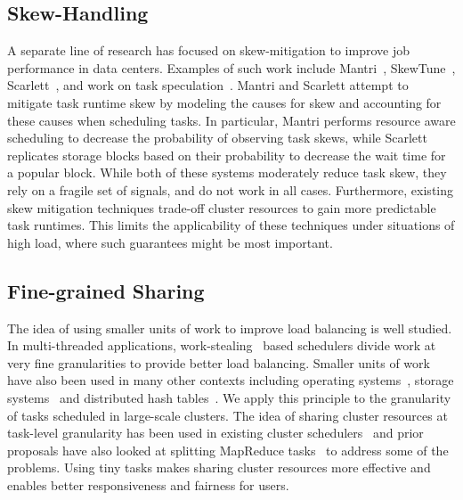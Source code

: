 \subsection{Skew-Handling}
A separate line of research has focused on skew-mitigation to improve job
performance in data centers. Examples of such work include
Mantri~\cite{ananthanarayanan2010reining}, SkewTune~\cite{kwon2012skewtune},
Scarlett~\cite{ananthanarayanan2011scarlett}, and work on task
speculation~\cite{zaharia2008improving}. Mantri and Scarlett attempt to
mitigate task runtime skew by modeling the causes for skew and accounting for
these causes when scheduling tasks. In particular, Mantri performs resource aware scheduling to decrease the
probability of observing task skews, while Scarlett replicates storage blocks
based on their probability to decrease the wait time for a popular block. While
both of these systems moderately reduce task skew, they rely on a fragile set of
signals, and do not work in all cases.
Furthermore, existing skew mitigation techniques trade-off cluster resources to
gain more predictable task runtimes. This limits the applicability of these
techniques under situations of high load, where such guarantees might be most
important.

\subsection{Fine-grained Sharing}
The idea of using smaller units of work to improve load balancing is well
studied.  In multi-threaded applications, work-stealing~\cite{blumofe1994scheduling}
based schedulers divide work at very fine granularities to provide better load
balancing.  Smaller units of work have also been used in many other contexts
including operating systems~\cite{sherman1972trace}, storage systems~\cite{ghemawat2003google,
chang2008bigtable} and distributed hash tables~\cite{stoica2001chord}. We apply this
principle to the granularity of tasks scheduled in large-scale clusters.  The
idea of sharing cluster resources at task-level granularity has been used in
existing cluster schedulers~\cite{hindman2011mesos, zaharia2010delay} and prior
proposals have also looked at splitting MapReduce tasks~\cite{bhatotia2011incoop} to
address some of the problems.  Using tiny tasks makes sharing cluster resources
more effective and enables better responsiveness and fairness for users.


